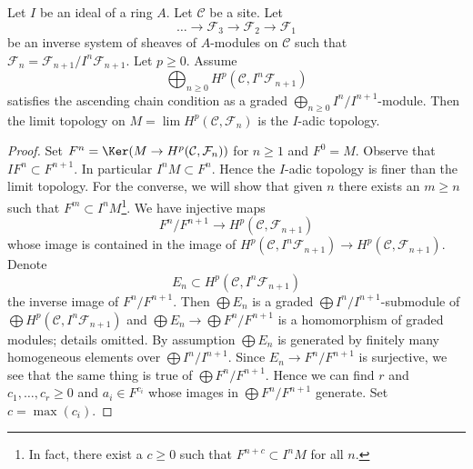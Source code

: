\begin{lemma}
\label{lemma-topology-I-adic-general}
Let $I$ be an ideal of a ring $A$. Let $\mathcal{C}$ be a site. Let
$$
\ldots \to \mathcal{F}_3 \to \mathcal{F}_2 \to \mathcal{F}_1
$$
be an inverse system of sheaves of $A$-modules on $\mathcal{C}$ such that
$\mathcal{F}_n = \mathcal{F}_{n + 1}/I^n\mathcal{F}_{n + 1}$.
Let $p \geq 0$. Assume
$$
\bigoplus\nolimits_{n \geq 0} H^p(\mathcal{C}, I^n\mathcal{F}_{n + 1})
$$
satisfies the ascending chain condition as a graded
$\bigoplus_{n \geq 0} I^n/I^{n + 1}$-module.
Then the limit topology on $M = \lim H^p(\mathcal{C}, \mathcal{F}_n)$
is the $I$-adic topology.
\end{lemma}

\begin{proof}
Set $F^n = \Ker(M \to H^p(\mathcal{C}, \mathcal{F}_n))$ for $n \geq 1$ and $F^0 = M$.
Observe that $I F^n \subset F^{n + 1}$. In particular $I^n M \subset F^n$.
Hence the $I$-adic topology is finer than the limit topology. For
the converse, we will show that given $n$
there exists an $m \geq n$ such that $F^m \subset I^nM$\footnote{In fact,
there exist a $c \geq 0$ such that $F^{n + c} \subset I^nM$ for all $n$.}.
We have injective maps
$$
F^n/F^{n + 1} \longrightarrow H^p(\mathcal{C}, \mathcal{F}_{n + 1})
$$
whose image is contained in the image of
$H^p(\mathcal{C}, I^n\mathcal{F}_{n + 1}) \to
H^p(\mathcal{C}, \mathcal{F}_{n + 1})$.
Denote
$$
E_n \subset H^p(\mathcal{C}, I^n\mathcal{F}_{n + 1})
$$
the inverse image of $F^n/F^{n + 1}$. Then $\bigoplus E_n$ is
a graded $\bigoplus I^n/I^{n + 1}$-submodule of
$\bigoplus H^p(\mathcal{C}, I^n\mathcal{F}_{n + 1})$ and
$\bigoplus E_n \to \bigoplus F^n/F^{n + 1}$ is a homomorphism of graded
modules; details omitted. By assumption $\bigoplus E_n$ is generated by
finitely many homogeneous elements over $\bigoplus I^n/I^{n + 1}$.
Since $E_n \to F^n/F^{n + 1}$ is surjective, we see that
the same thing is true of $\bigoplus F^n/F^{n + 1}$.
Hence we can find $r$ and $c_1, \ldots, c_r \geq 0$ and
$a_i \in F^{c_i}$ whose images in $\bigoplus F^n/F^{n + 1}$ generate.
Set $c = \max(c_i)$.


\end{proof}
